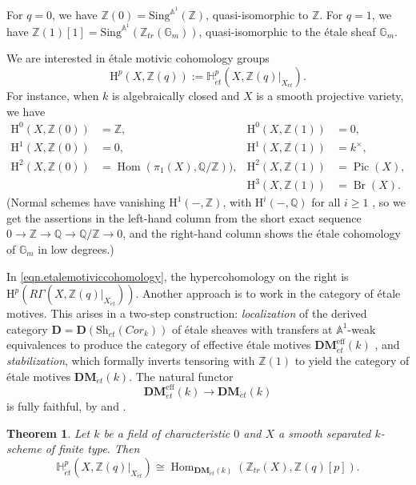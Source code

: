 \documentclass[12pt,reqno]{amsart}
\theoremstyle{plain}
\newtheorem{theo}[prop]{Theorem}
\theoremstyle{remark}
\theoremstyle{definition}
\numberwithin{equation}{section}
\newcommand{\A}{{\mathbb A}}
\newcommand{\G}{{\mathbb G}}
\newcommand{\rH}{{\mathrm H}}
\newcommand{\bA}{{\mathbb A}}
\newcommand{\bQ}{{\mathbb Q}}
\newcommand{\bZ}{{\mathbb Z}}
\DeclareMathOperator{\Pic}{Pic}
\DeclareMathOperator{\Hom}{Hom}
\DeclareMathOperator{\Br}{Br}
\begin{document}
For $q=0$, we have $\bZ(0)=\mathrm{Sing}^{\bA^1}(\bZ)$, quasi-isomorphic to $\bZ$.
For $q=1$, we have $\bZ(1)[1]=\mathrm{Sing}^{\bA^1}(\bZ_{tr}(\G_m))$, quasi-isomorphic to the \'etale sheaf $\mathbb G_m$.

We are interested in \'etale motivic cohomology groups
\begin{equation}
\label{eqn.etalemotiviccohomology}
\rH^p(X,\bZ(q)):=\mathbb{H}^p_{\acute et}(X,\bZ(q)|_{X_{\acute et}}).
\end{equation}
For instance, when $k$ is algebraically closed and $X$ is a smooth projective variety, we have
\begin{align*} 
\rH^0(X,\bZ(0))& =\bZ,& \rH^0(X,\bZ(1))& = 0,\\
\rH^1(X,\bZ(0))& = 0,& \rH^1(X,\bZ(1))&  = k^\times,  \\
\rH^2(X,\bZ(0))& = \Hom(\pi_1(X),\bQ/\bZ)), & \rH^2(X,\bZ(1))& = \Pic(X), \\
&&\rH^3(X,\bZ(1))& = \Br(X).
\end{align*}
(Normal schemes have vanishing $\rH^1({-},\bZ)$, with $\rH^i({-},\bQ)$ for all $i\ge 1$ \cite[(2.1)]{deninger}, so we get the assertions in the left-hand column from the short exact sequence $0\to \bZ\to \bQ\to \bQ/\bZ\to 0$, and the right-hand column shows the
\'etale cohomology of $\G_m$ in low degrees.)

In \eqref{eqn.etalemotiviccohomology}, the hypercohomology on the right is $\rH^p(R\Gamma(X,\bZ(q)|_{X_{\acute et}}))$.
Another approach is to work in the category of \'etale motives.
This arises in a two-step construction:
\emph{localization} of the derived category $\mathbf{D}=\mathbf{D}(\mathrm{Sh}_{\acute et}(Cor_k))$ of \'etale sheaves with transfers at $\A^1$-weak equivalences to produce the category of effective \'etale motives $\mathbf{DM}_{\acute et}^{\mathrm{eff}}(k)$ \cite[Defn.\ 9.2]{weibel},
and \emph{stabilization}, which formally inverts tensoring with $\bZ(1)$ to yield the category of \'etale motives $\mathbf{DM}_{\acute et}(k)$.
The natural functor
\[ \mathbf{DM}_{\acute et}^{\mathrm{eff}}(k)\to \mathbf{DM}_{\acute et}(k) \]
is fully faithful, by
\cite[Prop.\ A.3]{huberkahn}
and \cite[Lemme 4.2]{ayoubrealisation}.



\begin{theo}
\label{thm.etalemotiviccohoDM}
Let $k$ be a field of characteristic $0$ and $X$ a smooth separated $k$-scheme of finite type.
Then
\[
\mathbb{H}^p_{\acute et}(X,\bZ(q)|_{X_{\acute et}}) \cong \Hom_{\mathbf{DM}_{\acute et}(k)}(\bZ_{tr}(X),\bZ(q)[p]).
\]
\end{theo}
\end{document}
